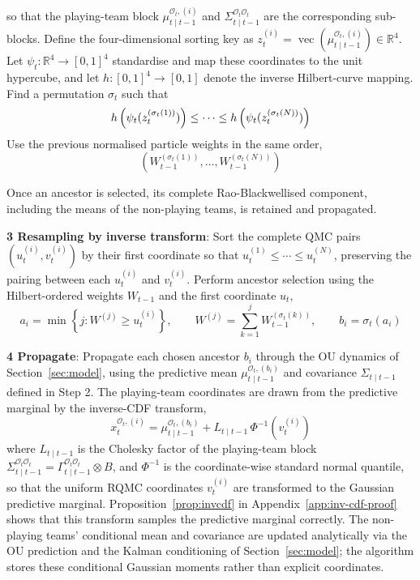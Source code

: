 so that the playing-team block $\mu_{t\mid t-1}^{\mathcal{O}_t,(i)}$ and $\Sigma_{t\mid t-1}^{\mathcal{O}_t\mathcal{O}_t}$ are the corresponding sub-blocks. Define the four-dimensional sorting key as $z_t^{(i)} = \operatorname{vec}\left( \mu_{t\mid t-1}^{\mathcal{O}_t,(i)} \right) \in \mathbb{R}^4$. Let $\psi_t:\mathbb{R}^4\rightarrow[0,1]^4$ standardise and map these coordinates to the unit hypercube, and let $h:[0,1]^4\rightarrow[0,1]$ denote the inverse Hilbert-curve mapping. Find a permutation $\sigma_t$ such that
\begin{equation*}
    h\left(\psi_t(z_t^{(\sigma_t(1))})\right) \leq \cdots \leq h\left(\psi_t(z_t^{(\sigma_t(N))})\right) \notag
\end{equation*}
Use the previous normalised particle weights in the same order,
\begin{equation*}
    \left( W_{t-1}^{(\sigma_t(1))}, \ldots, W_{t-1}^{(\sigma_t(N))} \right)
\end{equation*}

Once an ancestor is selected, its complete Rao-Blackwellised component, including the means of the non-playing teams, is retained and propagated.

\textbf{3 Resampling by inverse transform}: Sort the complete QMC pairs $(u_t^{(i)}, v_t^{(i)})$ by their first coordinate so that $u_t^{(1)} \le \cdots \le u_t^{(N)}$, preserving the pairing between each $u_t^{(i)}$ and $v_t^{(i)}$. Perform ancestor selection using the Hilbert-ordered weights $W_{t-1}$ and the first coordinate $u_t$,
\begin{equation*}
    a_i = \min \left\{ j : W^{(j)} \ge u_t^{(i)} \right\}, \qquad W^{(j)} = \sum_{k=1}^{j} W_{t-1}^{(\sigma_t(k))}, \qquad b_i = \sigma_t(a_i)
\end{equation*}

\textbf{4 Propagate}: Propagate each chosen ancestor $b_i$ through the OU dynamics of Section~\ref{sec:model}, using the predictive mean $\mu_{t\mid t-1}^{\mathcal{O}_t,(b_i)}$ and covariance $\Sigma_{t\mid t-1}$ defined in Step 2. The playing-team coordinates are drawn from the predictive marginal by the inverse-CDF transform,
\begin{equation*}
    x_t^{\mathcal{O}_t,(i)} = \mu_{t\mid t-1}^{\mathcal{O}_t,(b_i)} + L_{t\mid t-1}\, \Phi^{-1}\left( v_t^{(i)} \right)
\end{equation*}
where $L_{t\mid t-1}$ is the Cholesky factor of the playing-team block $\Sigma_{t\mid t-1}^{\mathcal{O}_t\mathcal{O}_t} = \Gamma_{t\mid t-1}^{\mathcal{O}_t\mathcal{O}_t} \otimes B$, and $\Phi^{-1}$ is the coordinate-wise standard normal quantile, so that the uniform RQMC coordinates $v_t^{(i)}$ are transformed to the Gaussian predictive marginal. Proposition~\ref{prop:invcdf} in Appendix~\ref{app:inv-cdf-proof} shows that this transform samples the predictive marginal correctly. The non-playing teams' conditional mean and covariance are updated analytically via the OU prediction and the Kalman conditioning of Section~\ref{sec:model}; the algorithm stores these conditional Gaussian moments rather than explicit coordinates.

